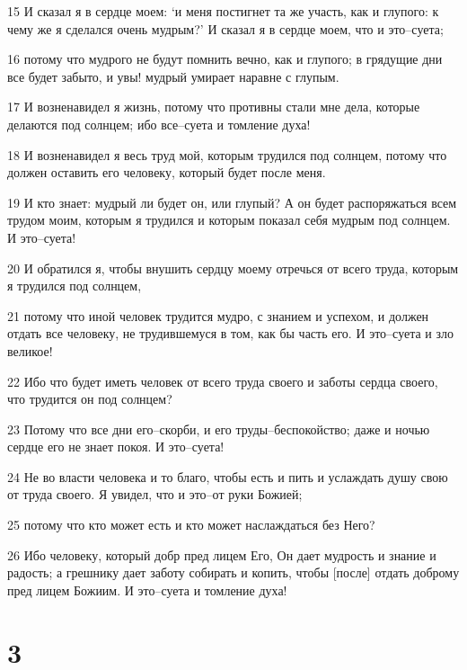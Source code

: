 \par 15 И сказал я в сердце моем: `и меня постигнет та же участь, как и глупого: к чему же я сделался очень мудрым?' И сказал я в сердце моем, что и это--суета;
\par 16 потому что мудрого не будут помнить вечно, как и глупого; в грядущие дни все будет забыто, и увы! мудрый умирает наравне с глупым.
\par 17 И возненавидел я жизнь, потому что противны стали мне дела, которые делаются под солнцем; ибо все--суета и томление духа!
\par 18 И возненавидел я весь труд мой, которым трудился под солнцем, потому что должен оставить его человеку, который будет после меня.
\par 19 И кто знает: мудрый ли будет он, или глупый? А он будет распоряжаться всем трудом моим, которым я трудился и которым показал себя мудрым под солнцем. И это--суета!
\par 20 И обратился я, чтобы внушить сердцу моему отречься от всего труда, которым я трудился под солнцем,
\par 21 потому что иной человек трудится мудро, с знанием и успехом, и должен отдать все человеку, не трудившемуся в том, как бы часть его. И это--суета и зло великое!
\par 22 Ибо что будет иметь человек от всего труда своего и заботы сердца своего, что трудится он под солнцем?
\par 23 Потому что все дни его--скорби, и его труды--беспокойство; даже и ночью сердце его не знает покоя. И это--суета!
\par 24 Не во власти человека и то благо, чтобы есть и пить и услаждать душу свою от труда своего. Я увидел, что и это--от руки Божией;
\par 25 потому что кто может есть и кто может наслаждаться без Него?
\par 26 Ибо человеку, который добр пред лицем Его, Он дает мудрость и знание и радость; а грешнику дает заботу собирать и копить, чтобы [после] отдать доброму пред лицем Божиим. И это--суета и томление духа!

\chapter{3}

